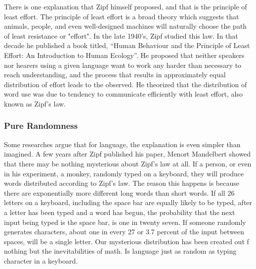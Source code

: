 \documentclass[a4paper,10pt]{article}
\begin{document}
There is one explanation that Zipf himself proposed, and that is the principle of least effort. The principle of least effort is a broad theory which suggests that animals, people, and even well-designed machines will naturally choose the path of least resistance or "effort". In the late 1940’s, Zipf studied this law. In that decade he published a book titled, “Human Behaviour and the Principle of Least Effort: An Introduction to Human Ecology”. He proposed that neither speakers nor hearers using a given language want to work any harder than necessary to reach understanding, and the process that results in approximately equal distribution of effort leads to the observed. He theorized that the distribution of word use was due to tendency to communicate efficiently with least effort, also known as Zipf’s law. 


\subsubsection{Pure Randomness}

Some researches argue that for language, the explanation is even simpler than imagined. A few years after Zipf published his paper, Menort Mandelbert showed that there may be nothing mysterious about Zipf's law at all. If a person, or even in his experiment, a monkey, randomly typed on a keyboard, they will produce words distributed according to Zipf's law. The reason this happens is because there are exponentially more different long words than short words. If all 26 letters on a keyboard, including the space bar are equally likely to be typed, after a letter has been typed and a word has begun, the probability that the next input being typed is the space bar, is one in twenty seven.  If someone randomly generates  characters, about one in every 27 or 3.7 percent of the input between spaces, will be a single letter. Our mysterious distribution has been created out f nothing but the inevitabilities of math. Is language just as random as typing character in a keyboard. 


\subsubsection{}
\end{document}
